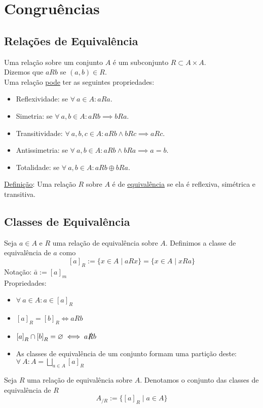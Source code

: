 \documentclass{article}
\begin{document}
\section{Congruências}

\subsection{Relações de Equivalência}
Uma relação sobre um conjunto $A$ é um subconjunto $R \subset A \times A$. \\
Dizemos que $a R b$ se $(a,b) \in R$. \\[5pt]
Uma relação \uline{pode} ter as seguintes propriedades:
\begin{itemize}
  \item Reflexividade: se $\forall \: a \in A: aRa$.
  \item Simetria: se $\forall \: a,b \in A: aRb \implies bRa$.
  \item Transitividade: $\forall \: a,b,c \in A: aRb \land bRc \implies aRc$.
  \item Antissimetria: se $\forall \: a,b \in A: aRb \land bRa \implies a = b$.
  \item Totalidade: se $\forall \: a,b \in A: aRb \oplus bRa$.
\end{itemize}
\uline{Definição}: Uma relação $R$ sobre $A$ é de \uline{equivalência} se ela é reflexiva, simétrica e transitiva.


\pagebreak


\subsection{Classes de Equivalência}
Seja $a \in A$ e $R$ uma relação de equivalência sobre $A$. Definimos a classe de equivalência de $a$ como
\[ {[a]}_R := \{ x \in A \mid aRx \} = \{ x \in A \mid xRa \} \]
Notação: $\bar{a} := {[a]}_m$ \\[5pt]
Propriedades:
\begin{itemize}
  \item $\forall \: a \in A: a \in {[a]}_R$
  \item ${[a]}_R = {[b]}_R \iff aRb$
  \item ${[a]}_R \cap {[b]}_R = \varnothing \iff a\slashed{R}b$
  \item As classes de equivalência de um conjunto formam uma partição deste: $\forall \: A: A = \bigsqcup\limits_{a \in A} {[a]}_R$
\end{itemize}
Seja $R$ uma relação de equivalência sobre $A$. Denotamos o conjunto das classes de equivalência de $R$
\[ A_{/R} := \{ {[a]}_R \mid a \in A \} \]
\end{document}
